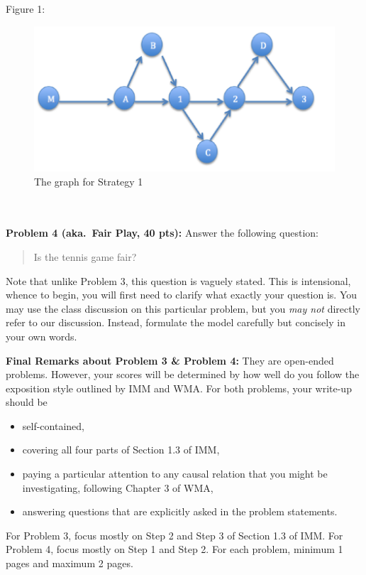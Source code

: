 \documentclass[12pt]{article}
\begin{document}
Figure 1:\\
\begin{figure}[h]
    \begin{center}
        \includegraphics[scale=0.6]{s1.png}
    \end{center}
    \caption{The graph for Strategy 1}
    \label{fig:branch}
\end{figure}
\\
\\
 






\vskip0.25in
\noindent\textbf{Problem 4 (aka.\ Fair Play, 40 pts):}
Answer the following question:
\begin{verse}
Is the tennis game fair?
\end{verse}
Note that unlike Problem 3, this question is vaguely stated.
This is intensional, whence to begin, you will first need to clarify
what exactly your question is.
You may use the class discussion on this particular 
problem, but you \emph{may not} directly refer to our 
discussion.  Instead, formulate the model carefully but concisely in 
your own words.   

\vskip0.25in
\noindent\textbf{Final Remarks about Problem 3 \& Problem 4:} 
They are open-ended problems.  However, your scores will be determined
by how well do you follow the exposition style outlined by IMM and
WMA.  For both problems, your write-up should be 
\begin{itemize}
\item self-contained,
\item covering all four parts of Section 1.3 of IMM,
\item paying a particular attention to any causal relation that you
  might be investigating, following Chapter 3 of WMA,
\item answering questions that are explicitly asked in the problem statements.
\end{itemize}
For Problem 3, focus mostly on Step 2 and Step 3 of Section
1.3 of IMM.  For Problem 4, focus mostly on Step 1 and Step
2.  For each problem, minimum 1 pages and maximum 2 pages.
\end{document}
